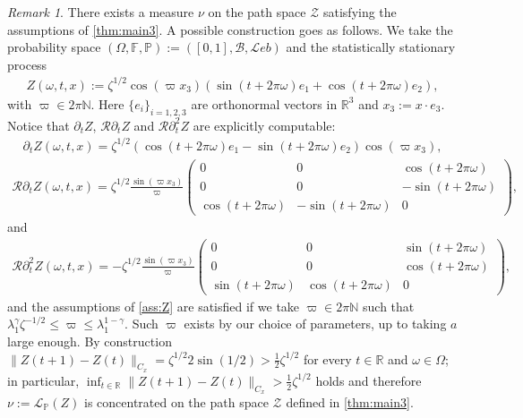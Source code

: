 \documentclass[10pt,a4paper]{amsart}
\numberwithin{equation}{section}
\numberwithin{corollario}{section}
\numberwithin{lemma}{section}
\numberwithin{prop}{section}
\theoremstyle{definition}
\theoremstyle{remark}
\newtheorem{oss}[thm]{Remark}
\newcommand{\N}{\mathbb{N}}
\newcommand{\R}{\mathbb{R}}
\begin{document}
\begin{oss} \label{oss:Z}
    There exists a measure $\nu$ on the path space $\mathscr{Z}$ satisfying the assumptions of \autoref{thm:main3}.
    A possible construction goes as follows.
We take the probability space $(\Omega,\mathbb{F},\mathbb{P}) := ([0,1],\mathscr{B}, \mathcal{L}eb)$ and the statistically stationary process 
\begin{align}
 Z(\omega,t,x) := \zeta^{1/2}  \cos(\varpi x_3) (\sin(t+2\pi\omega) e_1 + \cos(t+2\pi \omega)e_2),   
\end{align}
with $\varpi \in 2\pi \N$. Here $\{e_i\}_{i={1,2,3}}$ are orthonormal vectors in $\R^3$ and $x_3 := x \cdot e_3$. 
Notice that $\partial_tZ$, $\mathcal{R}\partial_tZ$ and $\mathcal{R}\partial_t^2Z$ are explicitly computable:
\begin{align}
  \partial_t Z(\omega,t,x) =  \zeta^{1/2} (\cos(t+2\pi\omega) e_1 - \sin(t+2\pi \omega)e_2) \cos(\varpi x_3),
\end{align}
\begin{align}
        \mathcal{R}\partial_t Z (\omega,t,x) 
        = 
        \zeta^{1/2}  \frac{\sin(\varpi x_3)}{\varpi}  \begin{pmatrix}
0&0&\cos(t+2\pi\omega) \\
             0&0&-\sin(t+2\pi\omega) \\
             \cos(t+2\pi\omega)&-\sin(t+2\pi\omega)&0
\end{pmatrix},
\end{align}
and
\begin{align}
        \mathcal{R}\partial_t^2 Z (\omega,t,x) 
        = 
        -\zeta^{1/2}  \frac{\sin(\varpi x_3)}{\varpi}  \begin{pmatrix}
0&0&\sin(t+2\pi\omega) \\
             0&0&\cos(t+2\pi\omega) \\
             \sin(t+2\pi\omega)&\cos(t+2\pi\omega)&0
\end{pmatrix},
\end{align}
and the assumptions of \autoref{ass:Z} are satisfied if we take $\varpi \in 2\pi \N$ such that $\lambda_1^\gamma \zeta^{-1/2}\leq\varpi \leq \lambda_1^{1-\gamma}$. Such $\varpi$ exists by our choice of parameters, up to taking $a$ large enough.
By construction $\|Z(t+1) - Z(t)\|_{C_x}=\zeta^{1/2}2\sin(1/2) > \frac12 \zeta^{1/2}$ for every $t \in \R$ and $\omega \in \Omega$; in particular, $\inf_{t \in \R}\|Z(t+1) - Z(t)\|_{C_x} > \frac12  \zeta^{1/2}$ holds and therefore $\nu := \mathscr{L}_\mathbb{P}(Z)$ is concentrated on the path space $\mathscr{Z}$ defined in \autoref{thm:main3}.
    
\end{oss}
\end{document}
